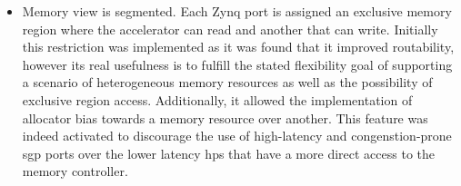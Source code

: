 \begin{itemize}
\item	Memory view is segmented. Each Zynq port is assigned an exclusive memory region
	where the accelerator can read and another that can write. 
	Initially this restriction was implemented as it was found that it improved routability,
	however its real usefulness is to fulfill the stated flexibility goal of supporting
	a scenario of heterogeneous memory resources as well as the possibility of exclusive region access.
	Additionally, it allowed the implementation of allocator bias towards a memory resource over another.
	This feature was indeed activated to discourage the use of high-latency and 
	congenstion-prone \gls{sgp} ports over the lower latency \glspl{hp} that have a more direct access
	to the memory controller.
\end{itemize}

